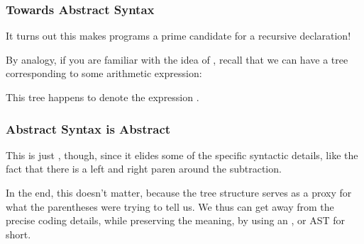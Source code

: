 \documentclass[aspectratio=169, handout]{beamer}
\begin{document}
\begin{frame}[fragile]
  \frametitle{Towards Abstract Syntax}

  It turns out this makes programs a prime candidate for a recursive 
  declaration!

  \pause
  \vspace{\fill}

  By analogy, if you are familiar with the idea of , recall that we can
  have a tree corresponding to some arithmetic expression:

  \begin{center}
  \end{center}

  \pause
  \vspace{\fill}

  This tree happens to denote the expression .
\end{frame}

\begin{frame}[fragile]
  \frametitle{Abstract Syntax is Abstract}

  This is just , though, since it elides some of the
  specific syntactic details, like the fact that there is a left and right paren
  around the subtraction.

  \pause
  \vspace{\fill}

  In the end, this doesn't matter, because the tree structure serves as a
  proxy for what the parentheses were trying to tell us. We thus can get away
  from the precise coding details, while preserving the meaning, by using an
  , or AST for short.
\end{frame}
\end{document}
